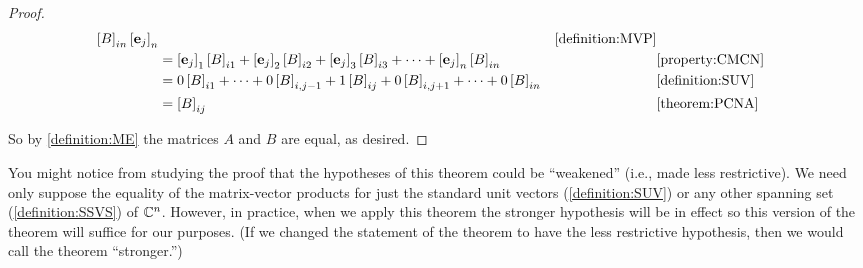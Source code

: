\documentclass{ximera}
\begin{document}
\begin{theorem}
\begin{proof}
\begin{align*}
        \left\lbrack B\right\rbrack_{in}\left\lbrack\mathbf{e}_j\right\rbrack_{n}&&\ref{definition:MVP}\\
      &=
        \left\lbrack\mathbf{e}_j\right\rbrack_{1}\left\lbrack B\right\rbrack_{i1}+
        \left\lbrack\mathbf{e}_j\right\rbrack_{2}\left\lbrack B\right\rbrack_{i2}+
        \left\lbrack\mathbf{e}_j\right\rbrack_{3}\left\lbrack B\right\rbrack_{i3}+
        \cdots+
        \left\lbrack\mathbf{e}_j\right\rbrack_{n}\left\lbrack B\right\rbrack_{in}&&\ref{property:CMCN}\\
      &=
        0\left\lbrack B\right\rbrack_{i1}+
        \cdots+
        0\left\lbrack B\right\rbrack_{i,j-1}+
        1\left\lbrack B\right\rbrack_{ij}+
        0\left\lbrack B\right\rbrack_{i,j+1}+
        \cdots+
        0\left\lbrack B\right\rbrack_{in}
      &&\ref{definition:SUV}\\
      &=\left\lbrack B\right\rbrack_{ij}
      &&\ref{theorem:PCNA}
    \end{align*}
    
    So by \ref{definition:ME} the matrices $A$ and $B$ are equal, as desired.

\end{proof}
\end{theorem}

You might notice from studying the proof that the hypotheses of this
theorem could be ``weakened'' (i.e., made less restrictive).  We need
only suppose the equality of the matrix-vector products for just the
standard unit vectors (\ref{definition:SUV}) or any other spanning set
(\ref{definition:SSVS}) of $\mathbb{C}^{n}$.  However, in practice, when
we apply this theorem the stronger hypothesis will be in effect so
this version of the theorem will suffice for our purposes.  (If we
changed the statement of the theorem to have the less restrictive
hypothesis, then we would call the theorem ``stronger.'')
\end{document}
